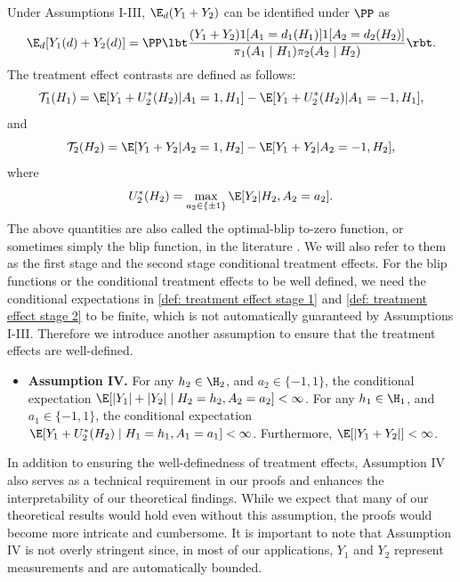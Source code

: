 \documentclass[preprint] {imsart}
\begin{document}
Under Assumptions I-III,   $\E_d (Y_1+Y_2)$ can be identified under $\PP$ as \citep{zhao2015} 
\begin{align*}
\E_{d} [Y_1(d)+Y_2(d)]=\PP\lbt \dfrac{( Y_1+Y_2) 1[A_1=d_1(H_1)] 1[A_2=d_2(H_2)]}{ \pi_1(A_1\mid H_1)\pi_2(A_2\mid H_2)}  \rbt.
\end{align*}
The treatment effect contrasts are defined as follows:
\begin{equation}\label{def: treatment effect stage 1}
 \mathcal T_1(H_1)=    \E[Y_1+U_2^*(H_2)|A_1=1, H_1]-\E[Y_1+U_2^*(H_2)|A_1=-1, H_1],
 \end{equation}
 and
\begin{equation}\label{def: treatment effect stage 2}
 \mathcal T_2(H_2)=   \E[Y_1+Y_2|A_2=1,H_2]-\E[Y_1+Y_2|A_2=-1,H_2],
 \end{equation}
 where
 \begin{equation}\label{def: U 2 star}
    U_2^*(H_2)=\max_{a_2\in\{\pm 1\}}\E[Y_2| H_2,A_2=a_2].
\end{equation}
The above quantities are also called the optimal-blip to-zero function, or sometimes simply the blip function, in the literature \citep{Robins2004, schulte2014, luedtke2016}. We will also refer to them as the first  stage and the second stage conditional treatment effects. 
For the blip functions or the conditional treatment effects to be well defined, we need the conditional expectations in \eqref{def: treatment effect stage 1} and \eqref{def: treatment effect stage 2} to be finite, which is not automatically guaranteed by Assumptions I-III. Therefore we introduce another assumption to ensure that the treatment effects are well-defined.
\begin{itemize}
    \item \textbf{Assumption IV.}  For any $h_2\in\H_2$, and $a_2\in\{-1,1\}$, the conditional expectation $\E[|Y_1|+|Y_2|\mid H_2=h_2, A_2=a_2]<\infty$. For any $h_1\in\H_1$, and $a_1\in\{-1,1\}$, the conditional expectation $\E[Y_1+U_2^*(H_2)\mid H_1=h_1, A_1=a_1]<\infty$. Furthermore, $\E[|Y_1+Y_2|]<\infty$.
\end{itemize}
In addition to ensuring the well-definedness of treatment effects, Assumption IV also serves as a  technical requirement in our proofs and enhances the interpretability of our theoretical findings. While we expect that many of our theoretical results would hold even without this assumption, the proofs would become more intricate and cumbersome. It is important to note that Assumption IV is not overly stringent since, in most of our applications, $Y_1$ and $Y_2$ represent measurements and are automatically bounded.
\end{document}
